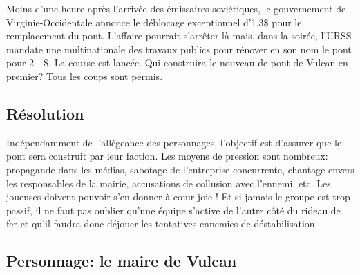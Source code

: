 Moins d'une heure après l'arrivée des émissaires soviétiques, le gouvernement de Virginie-Occidentale annonce le déblocage exceptionnel d'\SI{1,3}{\million}\$ pour le remplacement du pont.
L'affaire pourrait s'arrêter là mais, dans la soirée, l'URSS mandate une multinationale des travaux publics pour rénover en son nom le pont pour \SI{2}{\million\$}.
La course est lancée.
Qui construira le nouveau de pont de Vulcan en premier?
Tous les coups sont permis.

\subsection{Résolution}

Indépendamment de l'allégeance des personnages, l'objectif est d'assurer que le pont sera construit par leur faction.
Les moyens de pression sont nombreux: propagande dans les médias, sabotage de l'entreprise concurrente, chantage envers les responsables de la mairie, accusations de collusion avec l'ennemi, etc.
Les joueuses doivent pouvoir s'en donner à cœur joie ! Et si jamais le groupe est trop passif, il ne faut pas oublier qu'une équipe s'active de l'autre côté du rideau de fer et qu'il faudra donc déjouer les tentatives ennemies de déstabilisation.

\subsection*{Personnage: le maire de Vulcan}


{}
